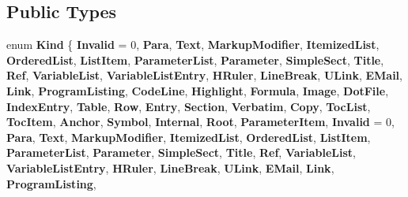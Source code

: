 \subsection*{Public Types}
\begin{DoxyCompactItemize}
\item 
\mbox{\label{class_i_doc_ada72396a5a52f43f68202112f1dd794f}} 
enum {\bfseries Kind} \{ \newline
{\bfseries Invalid} = 0, 
{\bfseries Para}, 
{\bfseries Text}, 
{\bfseries Markup\+Modifier}, 
\newline
{\bfseries Itemized\+List}, 
{\bfseries Ordered\+List}, 
{\bfseries List\+Item}, 
{\bfseries Parameter\+List}, 
\newline
{\bfseries Parameter}, 
{\bfseries Simple\+Sect}, 
{\bfseries Title}, 
{\bfseries Ref}, 
\newline
{\bfseries Variable\+List}, 
{\bfseries Variable\+List\+Entry}, 
{\bfseries H\+Ruler}, 
{\bfseries Line\+Break}, 
\newline
{\bfseries U\+Link}, 
{\bfseries E\+Mail}, 
{\bfseries Link}, 
{\bfseries Program\+Listing}, 
\newline
{\bfseries Code\+Line}, 
{\bfseries Highlight}, 
{\bfseries Formula}, 
{\bfseries Image}, 
\newline
{\bfseries Dot\+File}, 
{\bfseries Index\+Entry}, 
{\bfseries Table}, 
{\bfseries Row}, 
\newline
{\bfseries Entry}, 
{\bfseries Section}, 
{\bfseries Verbatim}, 
{\bfseries Copy}, 
\newline
{\bfseries Toc\+List}, 
{\bfseries Toc\+Item}, 
{\bfseries Anchor}, 
{\bfseries Symbol}, 
\newline
{\bfseries Internal}, 
{\bfseries Root}, 
{\bfseries Parameter\+Item}, 
{\bfseries Invalid} = 0, 
\newline
{\bfseries Para}, 
{\bfseries Text}, 
{\bfseries Markup\+Modifier}, 
{\bfseries Itemized\+List}, 
\newline
{\bfseries Ordered\+List}, 
{\bfseries List\+Item}, 
{\bfseries Parameter\+List}, 
{\bfseries Parameter}, 
\newline
{\bfseries Simple\+Sect}, 
{\bfseries Title}, 
{\bfseries Ref}, 
{\bfseries Variable\+List}, 
\newline
{\bfseries Variable\+List\+Entry}, 
{\bfseries H\+Ruler}, 
{\bfseries Line\+Break}, 
{\bfseries U\+Link}, 
\newline
{\bfseries E\+Mail}, 
{\bfseries Link}, 
{\bfseries Program\+Listing}, 

\end{DoxyCompactItemize}
